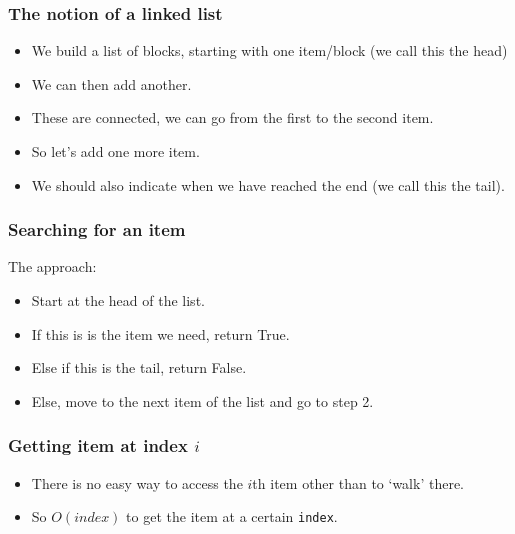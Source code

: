 \begin{frame}
	\frametitle{The notion of a linked list}
			\begin{itemize}
				\item We build a list of blocks, starting with one item/block (we call this the \alert{head})
				\item We can then add another.
				\item These are connected, we can go from the first to the second item.
				\item So let's add one more item.
				\item We should also indicate when we have reached the end (we call this the \alert{tail}).
			\end{itemize}
\end{frame}

\begin{frame}
	\frametitle{Searching for an item}	
	The approach:
	\begin{itemize}
		\item Start at the head of the list.
		\item If this is is the item we need, return True.
		\item Else if this is the tail, return False.
		\item Else, move to the next item of the list and go to step 2.
	\end{itemize}

	

	

\end{frame}

\begin{frame}
	\frametitle{Getting item at index $i$}

	\begin{itemize}
		\item There is no easy way to access the $i$th item other than to `walk' there.
		\item So $O(\textit{index})$ to get the item at a certain \texttt{index}.
	\end{itemize}
	
\end{frame}

